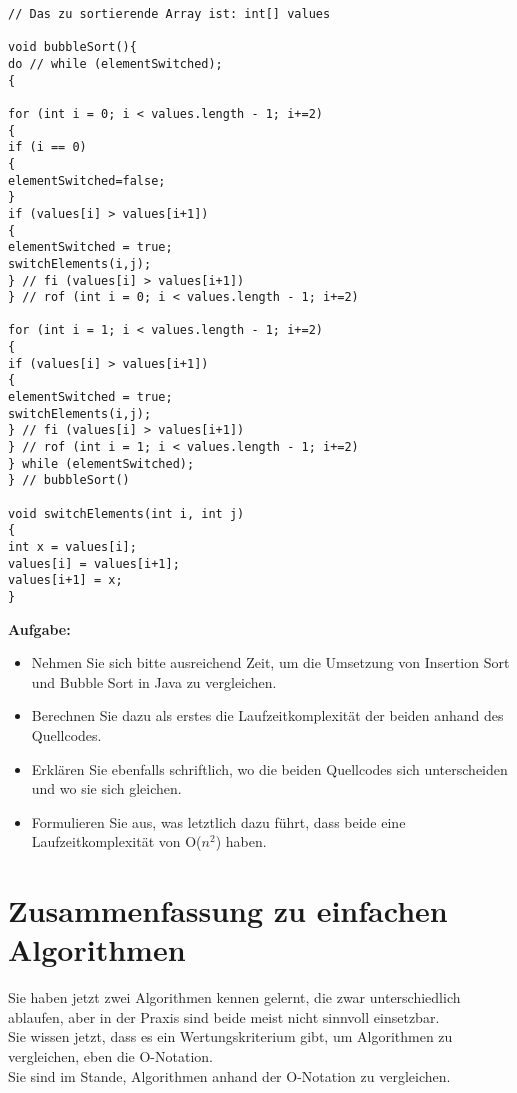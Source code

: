 \begin{verbatim}
// Das zu sortierende Array ist: int[] values

void bubbleSort(){
do // while (elementSwitched);
{

for (int i = 0; i < values.length - 1; i+=2)
{
if (i == 0)
{
elementSwitched=false;
}
if (values[i] > values[i+1])
{
elementSwitched = true;
switchElements(i,j);
} // fi (values[i] > values[i+1])
} // rof (int i = 0; i < values.length - 1; i+=2)

for (int i = 1; i < values.length - 1; i+=2)
{
if (values[i] > values[i+1])
{
elementSwitched = true;
switchElements(i,j);
} // fi (values[i] > values[i+1])
} // rof (int i = 1; i < values.length - 1; i+=2)
} while (elementSwitched);
} // bubbleSort()

void switchElements(int i, int j)
{
int x = values[i];
values[i] = values[i+1];
values[i+1] = x;
}
\end{verbatim}

\textbf{Aufgabe:}

\begin{itemize}
	\item Nehmen Sie sich bitte ausreichend Zeit, um die Umsetzung von Insertion Sort und Bubble Sort in Java zu vergleichen.
	\item Berechnen Sie dazu als erstes die Laufzeitkomplexität der beiden anhand des Quellcodes.
	\item Erklären Sie ebenfalls schriftlich, wo die beiden Quellcodes sich unterscheiden und wo sie sich gleichen.
	\item Formulieren Sie aus, was letztlich dazu führt, dass beide eine Laufzeitkomplexität von O(\(n^2\)) haben.
\end{itemize}

\section{Zusammenfassung zu einfachen Algorithmen}

Sie haben jetzt zwei Algorithmen kennen gelernt, die zwar unterschiedlich ablaufen, aber in der Praxis sind beide meist nicht sinnvoll einsetzbar.\\

Sie wissen jetzt, dass es ein Wertungskriterium gibt, um Algorithmen zu vergleichen, eben die O-Notation.\\

Sie sind im Stande, Algorithmen anhand der O-Notation zu vergleichen.\\

